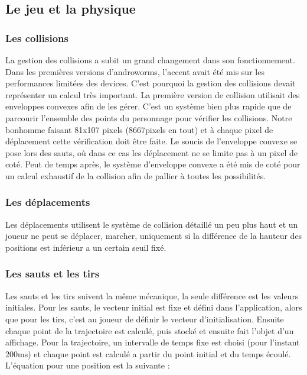 \documentclass{report}
\begin{document}
\subsection{Le jeu et la physique}

\subsubsection{Les collisions}
La gestion des collisions a subit un grand changement dans son fonctionnement.
Dans les premières versions d’androworms, l’accent avait été mis sur les performances limitées des devices. C’est pourquoi la gestion des collisions devait représenter un calcul très important. La première version de collision utilisait des enveloppes convexes afin de les gérer. C’est un système bien plus rapide que de parcourir l’ensemble des points du personnage pour vérifier les collisions. Notre bonhomme faisant 81x107 pixels (8667pixels en tout) et à chaque pixel de déplacement cette vérification doit être faite. Le soucis de l’enveloppe convexe se pose lors des sauts, où dans ce cas les déplacement ne se limite pas à un pixel de coté. Peut de temps après, le système d’enveloppe convexe a été mis de coté pour un calcul exhaustif de la collision afin de pallier à toutes les possibilités.

\subsubsection{Les déplacements}

Les déplacements utilisent le système de collision détaillé un peu plus haut et un joueur ne peut se déplacer, marcher, uniquement si la différence de la hauteur des positions est inférieur a un certain seuil fixé.

\subsubsection{Les sauts et les tirs}
Les sauts et les tirs suivent la même mécanique, la seule différence est les valeurs initiales. Pour les sauts, le vecteur initial est fixe et défini dans l’application, alors que pour les tirs, c’est au joueur de définir le vecteur d’initialisation. Ensuite chaque point de la trajectoire est calculé, puis stocké et ensuite fait l’objet d’un affichage. Pour la trajectoire, un intervalle de temps fixe est choisi (pour l’instant 200ms) et chaque point est calculé a partir du point initial et du temps écoulé.
L’équation pour une position est la suivante :
\end{document}
